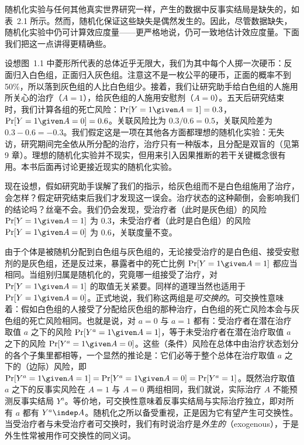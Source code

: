 随机化实验与任何其他真实世界研究一样，产生的数据中反事实结局是缺失的，如表~2.1 所示。然而，随机化保证这些缺失是偶然发生的。因此，尽管数据缺失，随机化实验中仍可计算效应度量——更严格地说，仍可一致地估计效应度量。下面我们把这一点讲得更精确些。

设想图~1.1 中菱形所代表的总体近乎无限大，我们为其中每个人掷一次硬币：反面归入白色组，正面归入灰色组。注意这不是一枚公平的硬币，正面的概率不到 50\%，所以落到灰色组的人比白色组少。接着，我们让研究助手给白色组的人施用所关心的治疗（$A=1$），给灰色组的人施用安慰剂（$A=0$）。五天后研究结束时，我们计算各组的死亡风险：$\Pr[Y=1\given A=1]=0.3$，$\Pr[Y=1\given A=0]=0.6$。关联风险比为 $0.3/0.6=0.5$，关联风险差为 $0.3-0.6=-0.3$。我们假定这是一项在其他各方面都理想的随机化实验：无失访，研究期间完全依从所分配的治疗，治疗只有一种版本，且分配是双盲的（见第 9 章）。理想的随机化实验并不现实，但用来引入因果推断的若干关键概念很有用。本书后面再讨论更接近现实的随机化实验。

现在设想，假如研究助手误解了我们的指示，给灰色组而不是白色组施用了治疗，会怎样？假定研究结束后我们才发现这一误会。治疗状态的这种颠倒，会影响我们的结论吗？丝毫不会。我们仍会发现，受治疗者（此时是灰色组）的风险 $\Pr[Y=1\given A=1]$ 为 0.3，未受治疗者（此时是白色组）的风险 $\Pr[Y=1\given A=0]$ 为 0.6，关联度量不变。

由于个体是被随机分配到白色组与灰色组的，无论接受治疗的是白色组、接受安慰剂的是灰色组，还是反过来，暴露者中的死亡比例 $\Pr[Y=1\given A=1]$ 都应当相同。当组别归属是随机化的，究竟哪一组接受了治疗，对 $\Pr[Y=1\given A=1]$ 的取值无关紧要。同样的道理当然也适用于 $\Pr[Y=1\given A=0]$。正式地说，我们称这两组是\emph{可交换的}。可交换性意味着：假如白色组的人接受了分配给灰色组的那种治疗，白色组的死亡风险本会与灰色组的死亡风险相同。也就是说，对 $a=0$ 与 $a=1$ 都有：受治疗者在潜在治疗取值 $a$ 之下的风险 $\Pr[Y^{a}=1\given A=1]$，等于未受治疗者在潜在治疗取值 $a$ 之下的风险 $\Pr[Y^{a}=1\given A=0]$。这些（条件）风险在总体中由治疗状态划分的各个子集里都相等，一个显然的推论是：它们必等于整个总体在治疗取值 $a$ 之下的（边际）风险，即 $\Pr[Y^{a}=1\given A=1]=\Pr[Y^{a}=1\given A=0]=\Pr[Y^{a}=1]$。既然治疗取值 $a$ 之下的反事实风险在 $A=1$ 与 $A=0$ 两组相同，我们就说，实际治疗 $A$ 不能预测反事实结局 $Y^{a}$。等价地，可交换性意味着反事实结局与实际治疗独立，即对所有 $a$ 都有 $Y^{a}\indep A$。随机化之所以备受重视，正是因为它有望产生可交换性。当受治疗者与未受治疗者可交换时，我们有时说治疗是\emph{外生的}（exogenous），于是外生性常被用作可交换性的同义词。


